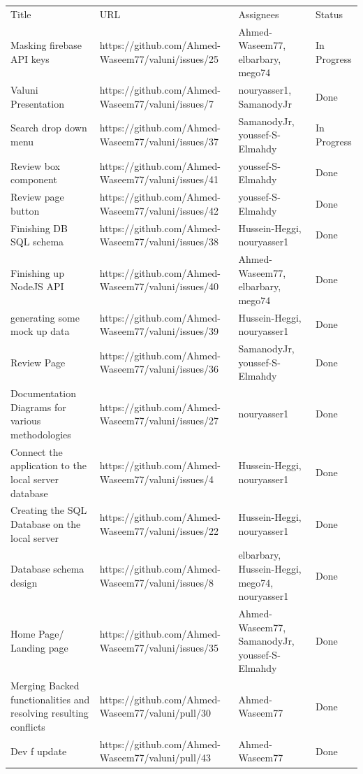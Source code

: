 \documentclass{article}
\begin{document}
\begin{landscape}
\begin{tabular}{llll}
Title &
  URL &
  Assignees &
  Status \\
Masking firebase API keys &
  https://github.com/Ahmed-Waseem77/valuni/issues/25 &
  Ahmed-Waseem77, elbarbary, mego74 &
  In Progress \\
Valuni Presentation &
  https://github.com/Ahmed-Waseem77/valuni/issues/7 &
  nouryasser1, SamanodyJr &
  Done \\
Search drop down menu &
  https://github.com/Ahmed-Waseem77/valuni/issues/37 &
  SamanodyJr, youssef-S-Elmahdy &
  In Progress \\
Review box component &
  https://github.com/Ahmed-Waseem77/valuni/issues/41 &
  youssef-S-Elmahdy &
  Done \\
Review page button &
  https://github.com/Ahmed-Waseem77/valuni/issues/42 &
  youssef-S-Elmahdy &
  Done \\
Finishing DB SQL schema &
  https://github.com/Ahmed-Waseem77/valuni/issues/38 &
  Hussein-Heggi, nouryasser1 &
  Done \\
Finishing up NodeJS API &
  https://github.com/Ahmed-Waseem77/valuni/issues/40 &
  Ahmed-Waseem77, elbarbary, mego74 &
  Done \\
generating some mock up data &
  https://github.com/Ahmed-Waseem77/valuni/issues/39 &
  Hussein-Heggi, nouryasser1 &
  Done \\
Review Page &
  https://github.com/Ahmed-Waseem77/valuni/issues/36 &
  SamanodyJr, youssef-S-Elmahdy &
  Done \\
Documentation Diagrams for various methodologies &
  https://github.com/Ahmed-Waseem77/valuni/issues/27 &
  nouryasser1 &
  Done \\
Connect the application to the local server database &
  https://github.com/Ahmed-Waseem77/valuni/issues/4 &
  Hussein-Heggi, nouryasser1 &
  Done \\
Creating the SQL Database on the local server &
  https://github.com/Ahmed-Waseem77/valuni/issues/22 &
  Hussein-Heggi, nouryasser1 &
  Done \\
Database schema design &
  https://github.com/Ahmed-Waseem77/valuni/issues/8 &
  elbarbary, Hussein-Heggi, mego74, nouryasser1 &
  Done \\
Home Page/ Landing page &
  https://github.com/Ahmed-Waseem77/valuni/issues/35 &
  Ahmed-Waseem77, SamanodyJr, youssef-S-Elmahdy &
  Done \\
Merging Backed functionalities and resolving resulting conflicts &
  https://github.com/Ahmed-Waseem77/valuni/pull/30 &
  Ahmed-Waseem77 &
  Done \\
Dev f update &
  https://github.com/Ahmed-Waseem77/valuni/pull/43 &
  Ahmed-Waseem77 &
  Done
\end{tabular}


\end{landscape}
\end{document}

